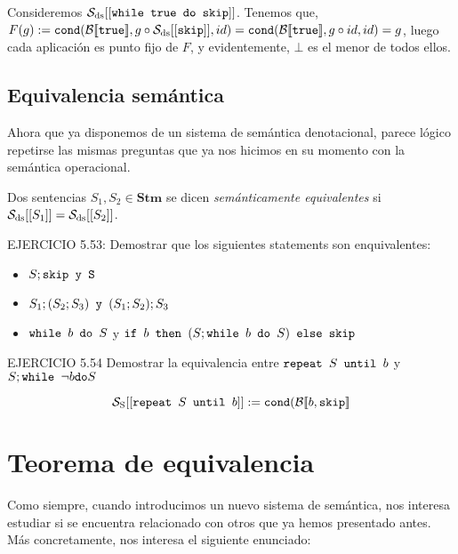 \begin{example}
Consideremos $\mathcal{S}_{\mathrm{ds}}[[\texttt{while true do skip}]]$. Tenemos que, $F(g) := \texttt{cond}(\mathcal{B}[\![\texttt{true}]\!], g\circ\mathcal{S}_{\mathrm{ds}}[[\texttt{skip}]], id) =  \texttt{cond}(\mathcal{B}[\![\texttt{true}]\!], g\circ id, id) = g$, luego cada aplicación es punto fijo de $F$, y evidentemente, $\bot$ es el menor de todos ellos.

\end{example}
 
\subsection{Equivalencia semántica}

Ahora que ya disponemos de un sistema de semántica denotacional, parece lógico repetirse las mismas preguntas que ya nos hicimos en su momento con la semántica operacional.

\begin{definition}
Dos sentencias $S_1, S_2 \in \mathbf{Stm}$ se dicen \textit{semánticamente equivalentes} si $\mathcal{S}_{\mathrm{ds}}[[S_1]] = \mathcal{S}_{\mathrm{ds}}[[S_2]]$.
\end{definition}

\begin{example} 
EJERCICIO 5.53: Demostrar que los siguientes statements son enquivalentes:
\begin{itemize}
    \item $S; \texttt{skip  y S}$
    \item $S_1;(S_2;S_3) \texttt{ y } (S_1; S_2);S_3$ 
    \item $\texttt{while } b \texttt{ do } S $ y $\texttt{if } b \texttt{ then } (S; \texttt{while } b \texttt{ do } S ) \texttt{ else skip}  $
\end{itemize}
\end{example}

\begin{example}
EJERCICIO 5.54 Demostrar la equivalencia entre $\texttt{repeat } S \texttt{ until } b $ y $S; \texttt{while } \neg b \texttt{do} S $

$$ \mathcal{S}_{\mathrm{S}}[[ \texttt{repeat } S \texttt{ until } b ]] := \texttt{cond}(\mathcal{B}[\![b, \texttt{skip}]\!]$$

\end{example}


\section{Teorema de equivalencia}

Como siempre, cuando introducimos un nuevo sistema de semántica, nos interesa estudiar si se encuentra relacionado con otros que ya hemos presentado antes. Más concretamente, nos interesa el siguiente enunciado:

